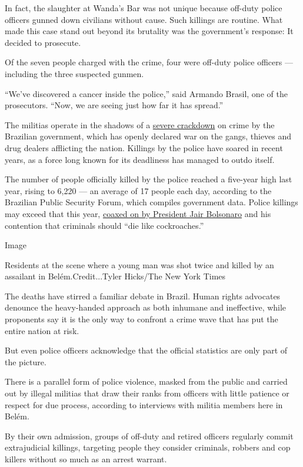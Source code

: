 In fact, the slaughter at Wanda's Bar was not unique because off-duty
police officers gunned down civilians without cause. Such killings are
routine. What made this case stand out beyond its brutality was the
government's response: It decided to prosecute.

Of the seven people charged with the crime, four were off-duty police
officers --- including the three suspected gunmen.

``We've discovered a cancer inside the police,'' said Armando Brasil,
one of the prosecutors. ``Now, we are seeing just how far it has
spread.''

The militias operate in the shadows of a
\href{https://www.nytimes.com/2019/05/26/world/americas/brazil-rio-police-kill.html}{severe
crackdown} on crime by the Brazilian government, which has openly
declared war on the gangs, thieves and drug dealers afflicting the
nation. Killings by the police have soared in recent years, as a force
long known for its deadliness has managed to outdo itself.

The number of people officially killed by the police reached a five-year
high last year, rising to 6,220 --- an average of 17 people each day,
according to the Brazilian Public Security Forum, which compiles
government data. Police killings may exceed that this year,
\href{https://www.nytimes.com/2018/11/01/world/americas/bolsonaro-police-kill-criminals.html}{coaxed
on by President Jair Bolsonaro} and his contention that criminals should
``die like cockroaches.''

Image

Residents at the scene where a young man was shot twice and killed by an
assailant in Belém.Credit...Tyler Hicks/The New York Times

The deaths have stirred a familiar debate in Brazil. Human rights
advocates denounce the heavy-handed approach as both inhumane and
ineffective, while proponents say it is the only way to confront a crime
wave that has put the entire nation at risk.

But even police officers acknowledge that the official statistics are
only part of the picture.

There is a parallel form of police violence, masked from the public and
carried out by illegal militias that draw their ranks from officers with
little patience or respect for due process, according to interviews with
militia members here in Belém.

By their own admission, groups of off-duty and retired officers
regularly commit extrajudicial killings, targeting people they consider
criminals, robbers and cop killers without so much as an arrest warrant.

